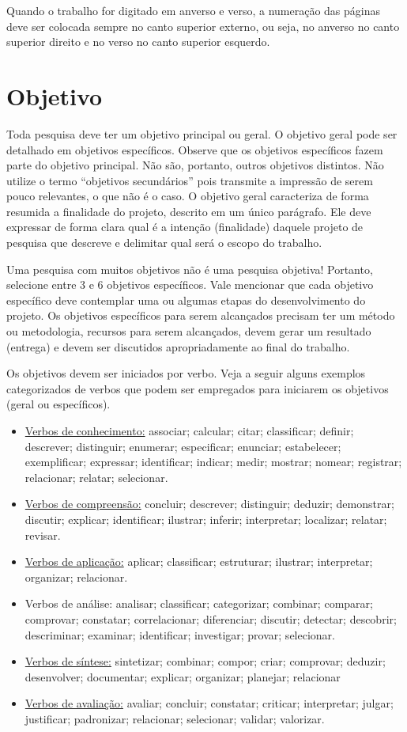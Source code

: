 Quando o trabalho for digitado em anverso e verso, a numeração das páginas deve ser colocada sempre no canto superior externo, ou seja, no anverso no canto superior direito e no verso no canto superior esquerdo.


\section{Objetivo}

Toda pesquisa deve ter um objetivo principal ou geral. O objetivo geral pode ser detalhado em objetivos específicos. Observe que os objetivos específicos fazem parte do objetivo principal. Não são, portanto, outros objetivos distintos. Não utilize o termo “objetivos secundários” pois transmite a impressão de serem pouco relevantes, o que não é o caso. O objetivo geral caracteriza de forma resumida a finalidade do projeto, descrito em um único parágrafo. Ele deve expressar de forma clara qual é a intenção (finalidade) daquele projeto de pesquisa que descreve e delimitar qual será o escopo do trabalho.

Uma pesquisa com muitos objetivos não é uma pesquisa objetiva! Portanto, selecione entre 3 e 6 objetivos específicos. Vale mencionar que cada objetivo específico deve contemplar uma ou algumas etapas do desenvolvimento do projeto. Os objetivos específicos para serem alcançados precisam ter um método ou metodologia, recursos para serem alcançados, devem gerar um resultado (entrega) e devem ser discutidos apropriadamente ao final do trabalho.

Os objetivos devem ser iniciados por verbo. Veja a seguir alguns exemplos categorizados de verbos que podem ser empregados para iniciarem os objetivos (geral ou específicos).


\begin{itemize}
    \item \underline{Verbos de conhecimento:} associar; calcular; citar; classificar; definir; descrever; distinguir; enumerar; especificar; enunciar; estabelecer; exemplificar; expressar; identificar; indicar; medir; mostrar; nomear; registrar; relacionar; relatar; selecionar.
    \item \underline{Verbos de compreensão:} concluir; descrever; distinguir; deduzir; demonstrar; discutir; explicar; identificar; ilustrar; inferir; interpretar; localizar; relatar; revisar.
    \item \underline{Verbos de aplicação:} aplicar; classificar; estruturar; ilustrar; interpretar; organizar; relacionar.
    \item Verbos de análise: analisar; classificar; categorizar; combinar; comparar; comprovar; constatar; correlacionar; diferenciar; discutir; detectar; descobrir; descriminar; examinar; identificar; investigar; provar; selecionar.
    \item \underline{Verbos de síntese:} sintetizar; combinar; compor; criar; comprovar; deduzir; desenvolver; documentar; explicar; organizar; planejar; relacionar
    \item \underline{Verbos de avaliação:} avaliar; concluir; constatar; criticar; interpretar; julgar; justificar; padronizar; relacionar; selecionar; validar; valorizar.
\end{itemize}

